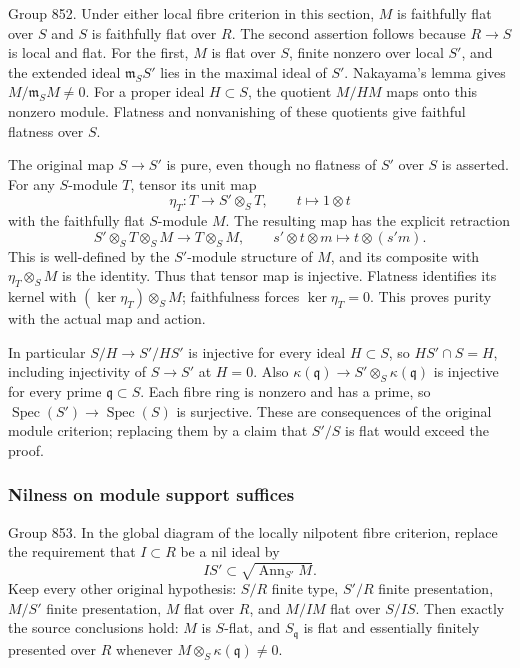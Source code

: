 Group 852. Under either local fibre criterion in this section, \(M\) is faithfully flat over \(S\) and \(S\) is faithfully flat over \(R\). The second assertion follows because \(R\to S\) is local and flat. For the first, \(M\) is flat over \(S\), finite nonzero over local \(S'\), and the extended ideal \(\mathfrak m_SS'\) lies in the maximal ideal of \(S'\). Nakayama's lemma gives \(M/\mathfrak m_SM\ne0\). For a proper ideal \(H\subset S\), the quotient \(M/HM\) maps onto this nonzero module. Flatness and nonvanishing of these quotients give faithful flatness over \(S\).

The original map \(S\to S'\) is pure, even though no flatness of \(S'\) over \(S\) is asserted. For any \(S\)-module \(T\), tensor its unit map \[
\eta_T:T\longrightarrow S'\otimes_S T,\qquad t\longmapsto1\otimes t
\] with the faithfully flat \(S\)-module \(M\). The resulting map has the explicit retraction \[
S'\otimes_S T\otimes_S M\longrightarrow T\otimes_S M,\qquad
s'\otimes t\otimes m\longmapsto t\otimes(s'm).
\] This is well-defined by the \(S'\)-module structure of \(M\), and its composite with \(\eta_T\otimes_S M\) is the identity. Thus that tensor map is injective. Flatness identifies its kernel with \((\ker\eta_T)\otimes_S M\); faithfulness forces \(\ker\eta_T=0\). This proves purity with the actual map and action.

In particular \(S/H\to S'/HS'\) is injective for every ideal \(H\subset S\), so \(HS'\cap S=H\), including injectivity of \(S\to S'\) at \(H=0\). Also \(\kappa(\mathfrak q)\to S'\otimes_S\kappa(\mathfrak q)\) is injective for every prime \(\mathfrak q\subset S\). Each fibre ring is nonzero and has a prime, so \(\operatorname{Spec}(S')\to\operatorname{Spec}(S)\) is surjective. These are consequences of the original module criterion; replacing them by a claim that \(S'/S\) is flat would exceed the proof.

\subsubsection{Nilness on module support suffices}\label{nilness-on-module-support-suffices}

Group 853. In the global diagram of the locally nilpotent fibre criterion, replace the requirement that \(I\subset R\) be a nil ideal by \[
IS'\subset\sqrt{\operatorname{Ann}_{S'}M}.
\] Keep every other original hypothesis: \(S/R\) finite type, \(S'/R\) finite presentation, \(M/S'\) finite presentation, \(M\) flat over \(R\), and \(M/IM\) flat over \(S/IS\). Then exactly the source conclusions hold: \(M\) is \(S\)-flat, and \(S_{\mathfrak q}\) is flat and essentially finitely presented over \(R\) whenever \(M\otimes_S\kappa(\mathfrak q)\ne0\).

